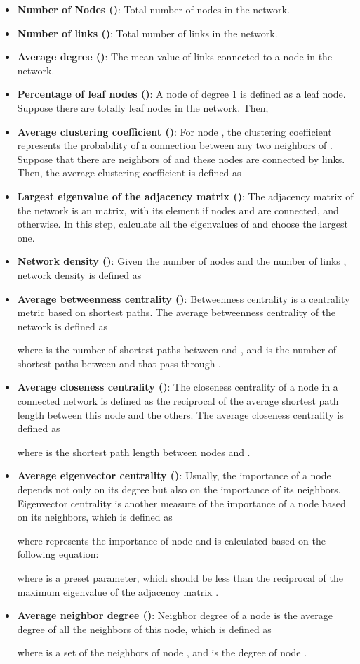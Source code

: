 \documentclass[10pt,journal,compsoc]{IEEEtran}
\begin{document}
\begin{itemize}
\item \textbf{Number of Nodes ()}: Total number of nodes in the network.
\item \textbf{Number of links ()}: Total number of links in the network.
\item \textbf{Average degree ()}: The mean value of links connected to a node in the network.
\item \textbf{Percentage of leaf nodes ()}: A node of degree 1 is defined as a leaf node. Suppose there are totally  leaf nodes in the network. Then,

\item \textbf{Average clustering coefficient ()}: For node , the clustering coefficient represents the probability of a connection between any two neighbors of . Suppose that there are  neighbors of  and these nodes are connected by  links. Then, the average clustering coefficient is defined as

\item \textbf{Largest eigenvalue of the adjacency matrix ()}: The adjacency matrix  of the network is an  matrix, with its element  if nodes  and  are connected, and  otherwise. In this step, calculate all the eigenvalues of  and choose the largest one.
\item \textbf{Network density ()}: Given the number of nodes  and the number of links , network density is defined as

\item \textbf{Average betweenness centrality ()}: Betweenness centrality is a centrality metric based on shortest paths. The average betweenness centrality of the network is defined as

where  is the number of shortest paths between  and , and  is the number of shortest paths between  and  that pass through .  	
\item \textbf{Average closeness centrality ()}: The closeness centrality of a node in a connected network is defined as the reciprocal of the average shortest path length between this node and the others. The average closeness centrality is defined as

where  is the shortest path length between nodes  and .
\item \textbf{Average eigenvector centrality ()}: Usually, the importance of a node depends not only on its degree but also on the importance of its neighbors. Eigenvector centrality is another measure of the importance of a node based on its neighbors, which is defined as

where  represents the importance of node  and is calculated based on the following equation:

where  is a preset parameter, which should be less than the reciprocal of the maximum eigenvalue of the adjacency matrix .
\item \textbf{Average neighbor degree ()}: Neighbor degree of a node is the average degree of all the neighbors of this node, which is defined as

where  is a set of the neighbors of node , and  is the degree of node .
\end{itemize}
\end{document}
